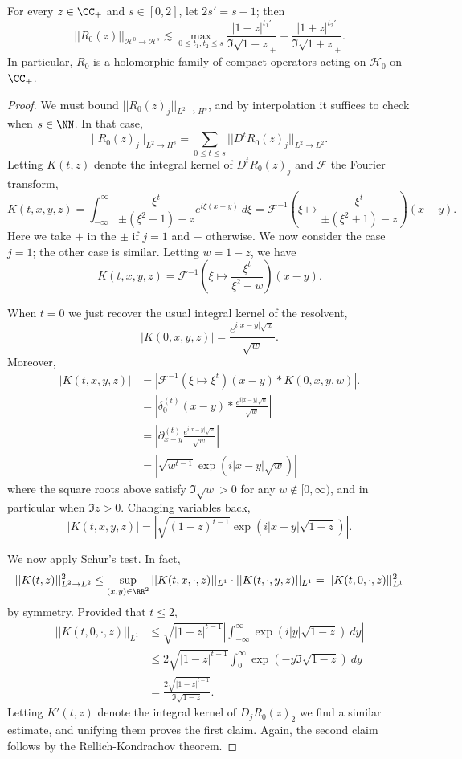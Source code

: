 \begin{lemma}
\label{sharp bound on upper half free resolvent}
For every $z \in \CC_+$ and $s \in [0, 2]$, let $2s' = s - 1$; then
$$||R_0(z)||_{\mathcal H^0 \to \mathcal H^s} \lesssim \max_{0 \leq t_1,t_2 \leq s} \frac{|1-z|^{t_1'}}{\Im \sqrt{1 - z}_+} + \frac{|1+z|^{t_2'}}{\Im \sqrt{1+ z}_+}.$$
In particular, $R_0$ is a holomorphic family of compact operators acting on $\mathcal H_0$ on $\CC_+$.
\end{lemma}
\begin{proof}
We must bound $||R_0(z)_j||_{L^2 \to H^s}$, and by interpolation it suffices to check when $s \in \NN$. In that case,
$$||R_0(z)_j||_{L^2 \to H^s} = \sum_{0 \leq t \leq s} ||D^tR_0(z)_j||_{L^2 \to L^2}.$$
Letting $K(t, z)$ denote the integral kernel of $D^tR_0(z)_j$ and $\mathcal F$ the Fourier transform,
$$K(t, x, y, z) = \int_{-\infty}^\infty \frac{\xi^t}{\pm(\xi^2 + 1)-z}e^{i\xi(x-y)}~d\xi = \mathcal F^{-1}\left(\xi \mapsto \frac{\xi^t}{\pm(\xi^2 +1)-z}\right)(x-y).$$
Here we take $+$ in the $\pm$ if $j = 1$ and $-$ otherwise. We now consider the case $j = 1$; the other case is similar. Letting $w = 1 - z$, we have
$$K(t, x, y, z) = \mathcal F^{-1}\left(\xi \mapsto \frac{\xi^t}{\xi^2 - w}\right)(x-y).$$

When $t = 0$ we just recover the usual integral kernel of the resolvent,
$$|K(0, x, y, z)| = \frac{e^{i|x-y|\sqrt w}}{\sqrt w}.$$
Moreover,
\begin{align*}
  |K(t, x, y, z)| &= |\mathcal F^{-1}(\xi \mapsto \xi^t)(x-y) * K(0, x, y, w)|.\\
  &= \left|\delta^{(t)}_0(x-y) * \frac{e^{i|x-y|\sqrt w}}{\sqrt w}\right|\\
  &= \left|\partial_{x-y}^{(t)} \frac{e^{i|x-y|\sqrt w}}{\sqrt w}\right|\\
  &= \left|\sqrt{w^{t-1}} \exp(i|x-y|\sqrt w)\right|
\end{align*}
where the square roots above satisfy $\Im \sqrt w > 0$ for any $w \notin [0, \infty)$, and in particular when $\Im z > 0$. Changing variables back,
$$|K(t, x, y, z)| = \left|\sqrt{(1-z)^{t-1}} \exp(i|x-y|\sqrt{1-z})\right|.$$

We now apply Schur's test. In fact,
$$||K(t, z)||_{L^2 \to L^2}^2 \leq \sup_{(x, y) \in \RR^2} ||K(t, x, \cdot, z)||_{L^1} \cdot ||K(t, \cdot, y, z)||_{L^1} = ||K(t, 0, \cdot, z)||_{L^1}^2$$
by symmetry. Provided that $t \leq 2$,
\begin{align*}
  ||K(t, 0, \cdot, z)||_{L^1} &\leq \sqrt{|1-z|^{t-1}} \left|\int_{-\infty}^\infty \exp(i|y|\sqrt{1-z}) ~dy\right|\\
  &\leq 2\sqrt{|1-z|^{t-1}} \int_0^\infty \exp(-y\Im\sqrt{1-z})~dy\\
  &= \frac{2\sqrt{|1-z|^{t-1}}}{\Im \sqrt{1-z}}.
\end{align*}
Letting $K'(t, z)$ denote the integral kernel of $D_jR_0(z)_2$ we find a similar estimate, and unifying them proves the first claim.
Again, the second claim follows by the Rellich-Kondrachov theorem.
\end{proof}

